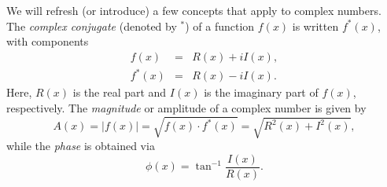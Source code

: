 We will refresh (or introduce) a few concepts that apply to complex numbers.
The \emph{complex conjugate} (denoted by $^*$) of a function $f(x)$ is written $f^*(x)$, with components
\begin{equation}
\begin{array}{lcr}
f(x) & = & R (x) + i I(x), \\[14pt]
f^{\ast}(x) & = & R (x) - i I(x).
\end{array}
\end{equation}
Here, $R(x)$ is the real part and $I(x)$ is the imaginary part of $f(x)$, respectively. The \emph{magnitude} or
amplitude of a complex number is given by
\begin{equation}
A(x) = | f(x) | = \sqrt{f(x) \cdot f^*(x)} = \sqrt{R^2 (x) + I^2 (x)},
\end{equation}
while the \emph{phase} is obtained via
\begin{equation}
\phi(x) = \tan^{-1} \frac{I(x)}{R(x)}.
\end{equation}

